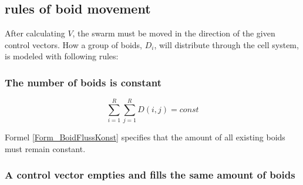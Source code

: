 \documentclass[a4paper, 10pt, journal]{wissarbIEEE}      %
\begin{document}
\subsection{rules of boid movement}



After calculating $ V $, the swarm must be moved in the direction of the given control vectors.
How a group of boids, $ D_i $, will distribute through the cell system, is modeled with following rules:

\subsubsection{The number of boids is constant}


\begin{equation}
\sum_{i=1}^R \sum_{j=1}^R D(i,j)  = const
\label{Form_BoidFlussKonst}
\end{equation}


Formel \ref{Form_BoidFlussKonst} specifies that the amount of all existing boids must remain constant.

\subsubsection{
A control vector empties and fills the same amount of boids}
\label{subsubsec_D_V}
\end{document}
